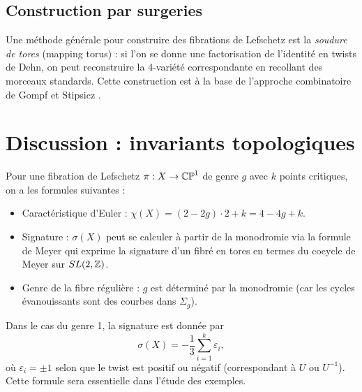 \subsection{Construction par surgeries}

Une méthode générale pour construire des fibrations de Lefschetz est la \emph{soudure de tores} (mapping torus) : si l'on se donne une factorisation de l'identité en twists de Dehn, on peut reconstruire la 4-variété correspondante en recollant des morceaux standards. Cette construction est à la base de l'approche combinatoire de Gompf et Stipsicz \cite{GS99}.

\section{Discussion : invariants topologiques}

Pour une fibration de Lefschetz $\pi: X \to \mathbb{CP}^1$ de genre $g$ avec $k$ points critiques, on a les formules suivantes :

\begin{itemize}
\item Caractéristique d'Euler : $\chi(X) = (2-2g) \cdot 2 + k = 4-4g + k$.
\item Signature : $\sigma(X)$ peut se calculer à partir de la monodromie via la formule de Meyer \cite{Meyer72} qui exprime la signature d'un fibré en tores en termes du cocycle de Meyer sur $SL(2,\mathbb{Z})$.
\item Genre de la fibre régulière : $g$ est déterminé par la monodromie (car les cycles évanouissants sont des courbes dans $\Sigma_g$).
\end{itemize}

Dans le cas du genre 1, la signature est donnée par
\[
\sigma(X) = -\frac{1}{3} \sum_{i=1}^k \varepsilon_i,
\]
où $\varepsilon_i = \pm 1$ selon que le twist est positif ou négatif (correspondant à $U$ ou $U^{-1}$). Cette formule sera essentielle dans l'étude des exemples.
